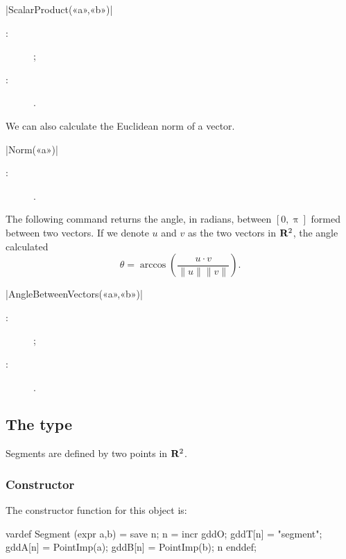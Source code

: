 \documentclass[a4paper,english]{article}
\begin{document}
\begin{colourband}
\macro|ScalarProduct(«a»,«b»)|
\begin{description}
  \item[:]  ;
  \item[:] .
\end{description}
\end{colourband}
\bigskip

We can also calculate the Euclidean norm of a vector.
\begin{colourband}
\macro|Norm(«a»)|
\begin{description}
  \item[:] .
\end{description}
\end{colourband}
\bigskip

The following command returns the angle, in radians, between $[0,\uppi]$ formed
between two vectors. If we denote $u$ and $v$ as the two vectors in $\mathbf{R}^2$, the angle
calculated
\[\theta = \arccos \left(\frac{u\cdot v}{\|u\|\|v\|}\right).\]

\begin{colourband}
\macro|AngleBetweenVectors(«a»,«b»)|
\begin{description}
  \item[:]  ;
  \item[:] .
\end{description}
\end{colourband}
\bigskip


\subsection{The  type}
Segments are defined by two points in $\mathbf{R}^2$.

\subsubsection{Constructor}
The constructor function for this object is:
\begin{mpcode}
vardef Segment (expr a,b) =
  save n; n = incr gddO;
  gddT[n] = "segment"; gddA[n] = PointImp(a); gddB[n] = PointImp(b); n
enddef;
\end{mpcode}
\end{document}
